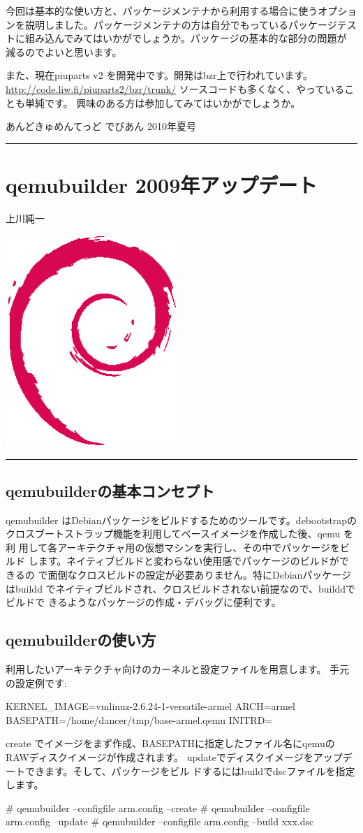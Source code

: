 \documentclass[mingoth,a4paper]{jsarticle}
\renewcommand{\dancersection}[2]{%
\newpage
あんどきゅめんてっど でびあん 2010年夏号
%
\vspace{0.1mm}\\
{\color{dancerlightblue}\rule{\hsize}{2mm}}

%
%
\begin{minipage}[t]{0.6\hsize}
\color{dancerdarkblue}
\vspace{1cm}
\section{#1}
\hfill{}#2\\
\end{minipage}
\begin{minipage}[t]{0.4\hsize}
\vspace{-2cm}
\hfill{}\includegraphics[height=8cm]{image200502/openlogo-nd.eps}\\
\vspace{-5cm}
\end{minipage}
%
%
{\color{dancerdarkblue}\rule{0.74\hsize}{2mm}}
%
\vspace{2cm}
}
\begin{document}
今回は基本的な使い方と、パッケージメンテナから利用する場合に使うオプショ
ンを説明しました。パッケージメンテナの方は自分でもっているパッケージテス
トに組み込んでみてはいかがでしょうか。パッケージの基本的な部分の問題が
減るのでよいと思います。

また、現在piuparts v2 を開発中です。開発はbzr上で行われています。
\url{http://code.liw.fi/piuparts2/bzr/trunk/}
ソースコードも多くなく、やっていることも単純です。
興味のある方は参加してみてはいかがでしょうか。

\dancersection{qemubuilder 2009年アップデート}{上川純一}
\label{sec:qemubuilder-update2009}

\subsection{qemubuilderの基本コンセプト}

qemubuilder はDebianパッケージをビルドするためのツールです。debootstrapの
クロスブートストラップ機能を利用してベースイメージを作成した後、qemu を利
用して各アーキテクチャ用の仮想マシンを実行し、その中でパッケージをビルド
します。ネイティブビルドと変わらない使用感でパッケージのビルドができるの
で面倒なクロスビルドの設定が必要ありません。特にDebianパッケージはbuildd
でネイティブビルドされ、クロスビルドされない前提なので、builddでビルドで
きるようなパッケージの作成・デバッグに便利です。

\subsection{qemubuilderの使い方}

利用したいアーキテクチャ向けのカーネルと設定ファイルを用意します。
手元の設定例です:
\begin{commandline}
KERNEL_IMAGE=vmlinuz-2.6.24-1-versatile-armel
ARCH=armel
BASEPATH=/home/dancer/tmp/base-armel.qemu
INITRD=
\end{commandline}

create でイメージをまず作成、BASEPATHに指定したファイル名にqemuの
RAWディスクイメージが作成されます。
updateでディスクイメージをアップデートできます。そして、パッケージをビル
ドするにはbuildでdscファイルを指定します。
\begin{commandline}
# qemubuilder --configfile arm.config --create 
# qemubuilder --configfile arm.config --update
# qemubuilder --configfile arm.config --build xxx.dsc
\end{commandline}
\end{document}
